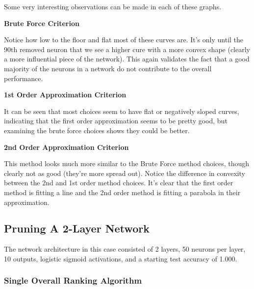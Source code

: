 
Some very interesting observations can be made in each of these graphs.

\textbf{Brute Force Criterion}

Notice how low to the floor and flat most of these curves are. It's only until the 90th removed neuron that we see a higher cure with a more convex shape (clearly a more influential piece of the network). This again validates the fact that a good majority of the neurons in a network do not contribute to the overall performance. 

\textbf{1st Order Approximation Criterion}

It can be seen that most choices seem to have flat or negatively sloped curves, indicating that the first order approximation seems to be pretty good, but examining the brute force choices shows they could be better. 

\textbf{2nd Order Approximation Criterion}

This method looks much more similar to the Brute Force method choices, though clearly not as good (they're more spread out). Notice the difference in convexity between the 2nd and 1st order method choices. It's clear that the first order method is fitting a line and the 2nd order method is fitting a parabola in their approximation. 

\subsection{Pruning A 2-Layer Network}
The network architecture in this case consisted of 2 layers, 50 neurons per layer, 10 outputs, logistic sigmoid activations, and a starting test accuracy of 1.000.
\subsubsection{Single Overall Ranking Algorithm}

